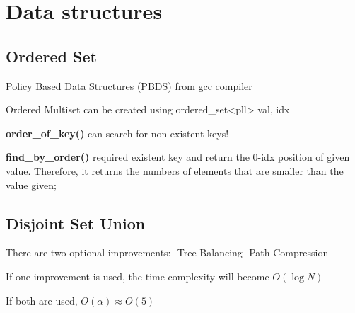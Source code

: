 \chapter{Data structures}

\section{Ordered Set}

    Policy Based Data Structures (PBDS) from gcc compiler

    Ordered Multiset can be created using ordered\_set<pll> {val, idx}

    \textbf{order\_of\_key()} can search for non-existent keys!
    
    \textbf{find\_by\_order()} required existent key and return the 0-idx position of given value.
    Therefore, it returns the numbers of elements that are smaller than the value given;


\section{Disjoint Set Union}

    There are two optional improvements:
        -Tree Balancing 
        -Path Compression

    If one improvement is used, 
    the time complexity will become $O(\log{N})$

    If both are used, $O(\alpha) \approx O(5)$

